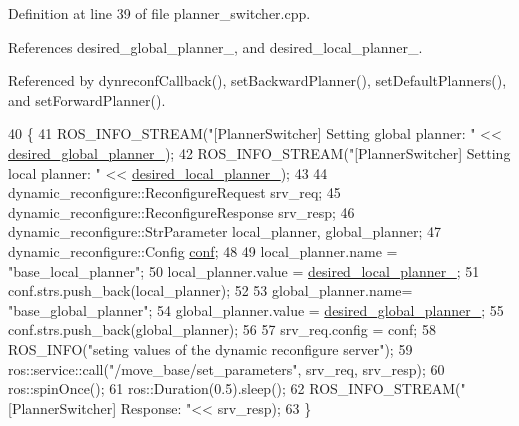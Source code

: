 Definition at line 39 of file planner\+\_\+switcher.\+cpp.



References desired\+\_\+global\+\_\+planner\+\_\+, and desired\+\_\+local\+\_\+planner\+\_\+.



Referenced by dynreconf\+Callback(), set\+Backward\+Planner(), set\+Default\+Planners(), and set\+Forward\+Planner().


\begin{DoxyCode}
40 \{
41   ROS\_INFO\_STREAM(\textcolor{stringliteral}{"[PlannerSwitcher] Setting global planner: "} << 
      \hyperlink{classsmacc__planner__switcher_1_1PlannerSwitcher_aed229df648a0903e3cdf77682220efb5}{desired\_global\_planner\_});
42   ROS\_INFO\_STREAM(\textcolor{stringliteral}{"[PlannerSwitcher] Setting local planner: "} << 
      \hyperlink{classsmacc__planner__switcher_1_1PlannerSwitcher_aecc5958653ed39dd7611783043d23345}{desired\_local\_planner\_});
43 
44   dynamic\_reconfigure::ReconfigureRequest srv\_req;
45   dynamic\_reconfigure::ReconfigureResponse srv\_resp;
46   dynamic\_reconfigure::StrParameter local\_planner, global\_planner;
47   dynamic\_reconfigure::Config \hyperlink{namespaceconf}{conf};
48 
49   local\_planner.name = \textcolor{stringliteral}{"base\_local\_planner"};
50   local\_planner.value =  \hyperlink{classsmacc__planner__switcher_1_1PlannerSwitcher_aecc5958653ed39dd7611783043d23345}{desired\_local\_planner\_};
51   conf.strs.push\_back(local\_planner);
52 
53   global\_planner.name= \textcolor{stringliteral}{"base\_global\_planner"};
54   global\_planner.value = \hyperlink{classsmacc__planner__switcher_1_1PlannerSwitcher_aed229df648a0903e3cdf77682220efb5}{desired\_global\_planner\_};
55   conf.strs.push\_back(global\_planner);
56   
57   srv\_req.config = conf;
58   ROS\_INFO(\textcolor{stringliteral}{"seting values of the dynamic reconfigure server"});
59   ros::service::call(\textcolor{stringliteral}{"/move\_base/set\_parameters"}, srv\_req, srv\_resp);
60   ros::spinOnce();
61   ros::Duration(0.5).sleep();
62   ROS\_INFO\_STREAM(\textcolor{stringliteral}{"[PlannerSwitcher] Response: "}<< srv\_resp);
63 \}
\end{DoxyCode}


